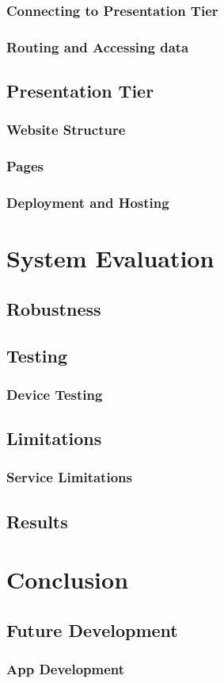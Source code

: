 \subsection{Connecting to Presentation Tier}
\subsection{Routing and Accessing data}


\section{Presentation Tier}
\subsection{Website Structure}
\subsection{Pages}
\subsection{Deployment and Hosting}

\chapter{System Evaluation}
\section{Robustness}

\section{Testing}
\subsection{Device Testing}

\section{Limitations}
\subsection{Service Limitations}

\section{Results}

\chapter{Conclusion}
\section{Future Development}
\subsection{App Development}

